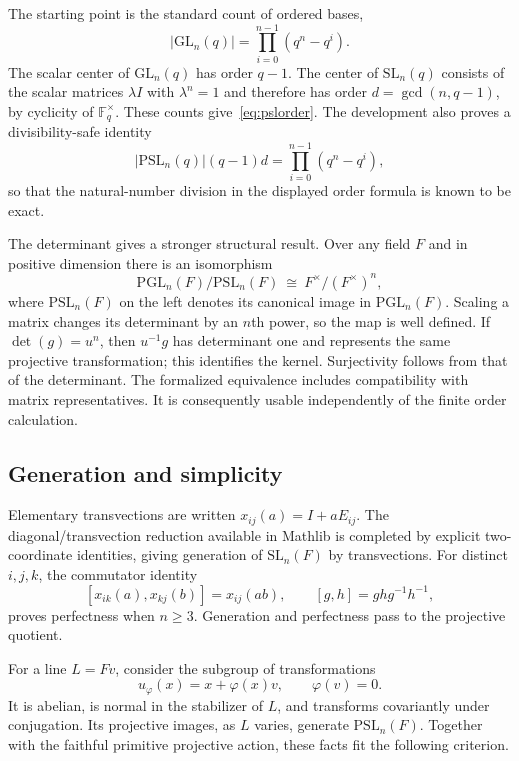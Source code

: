 \documentclass[11pt]{article}
\numberwithin{equation}{section}
\theoremstyle{definition}
\newcommand{\F}{\mathbb F}
\newcommand{\GL}{\mathrm{GL}}
\newcommand{\SL}{\mathrm{SL}}
\newcommand{\PGL}{\mathrm{PGL}}
\newcommand{\PSL}{\mathrm{PSL}}
\begin{document}
The starting point is the standard count of ordered bases,
\[
 |\GL_n(q)|=\prod_{i=0}^{n-1}(q^n-q^i).
\]
The scalar center of $\GL_n(q)$ has order $q-1$. The center of
$\SL_n(q)$ consists of the scalar matrices $\lambda I$ with
$\lambda^n=1$ and therefore has order $d=\gcd(n,q-1)$, by cyclicity
of $\F_q^{\times}$. These counts give~\eqref{eq:pslorder}.
The development also proves a divisibility-safe identity
\[
 |\PSL_n(q)|(q-1)d=\prod_{i=0}^{n-1}(q^n-q^i),
\]
so that the natural-number division in the displayed order formula is
known to be exact.

The determinant gives a stronger structural result. Over any field $F$
and in positive dimension there is an isomorphism
\begin{equation}\label{eq:detquot}
 \PGL_n(F)/\PSL_n(F)\ \cong\ F^{\times}/(F^{\times})^n,
\end{equation}
where $\PSL_n(F)$ on the left denotes its canonical image in $\PGL_n(F)$.
Scaling a matrix changes its determinant by an $n$th power, so the map
is well defined. If $\det(g)=u^n$, then $u^{-1}g$ has determinant one
and represents the same projective transformation; this identifies the
kernel. Surjectivity follows from that of the determinant.
The formalized equivalence includes compatibility with matrix
representatives. It is consequently usable independently of the finite
order calculation.

\subsection{Generation and simplicity}

Elementary transvections are written $x_{ij}(a)=I+aE_{ij}$.
The diagonal/transvection reduction available in Mathlib is completed
by explicit two-coordinate identities, giving generation of $\SL_n(F)$
by transvections. For distinct $i,j,k$, the commutator identity
\begin{equation}\label{eq:comm}
 [x_{ik}(a),x_{kj}(b)]=x_{ij}(ab),
 \qquad [g,h]=ghg^{-1}h^{-1},
\end{equation}
proves perfectness when $n\geq3$. Generation and perfectness pass to
the projective quotient.

For a line $L=Fv$, consider the subgroup of transformations
\[
 u_{\varphi}(x)=x+\varphi(x)v,\qquad \varphi(v)=0.
\]
It is abelian, is normal in the stabilizer of $L$, and transforms
covariantly under conjugation. Its projective images, as $L$ varies,
generate $\PSL_n(F)$. Together with the faithful primitive projective
action, these facts fit the following criterion.
\end{document}
